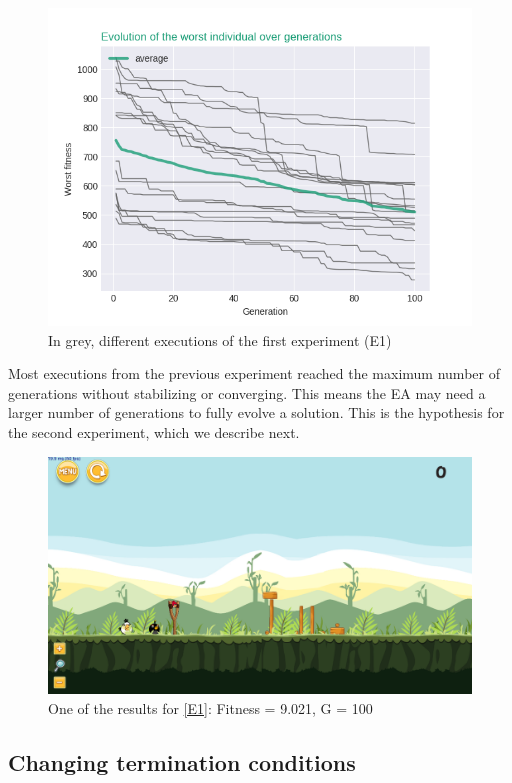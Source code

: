 \documentclass[sigconf]{acmart}
\begin{document}
\begin{figure}[H]
	\centering
	\includegraphics[scale=0.5]{exp1_worstIndv.png}
	\caption{In grey, different executions of the first experiment (E1)}\label{f:grahp1}
\end{figure}

Most executions from the previous experiment reached the maximum number of 
generations without stabilizing or converging. This means the EA may need a 
larger number of generations to fully evolve a solution. This is the hypothesis 
for the second experiment, which we describe next.
\begin{figure}
	\centering
	\includegraphics[scale=0.2]{level-0-180523_203106.png}
	\caption{One of the results for \ref{E1}: Fitness = 9.021, G = 100  }\label{f:e1}
\end{figure}
\subsection{Changing termination conditions} \label{E2}
\end{document}
